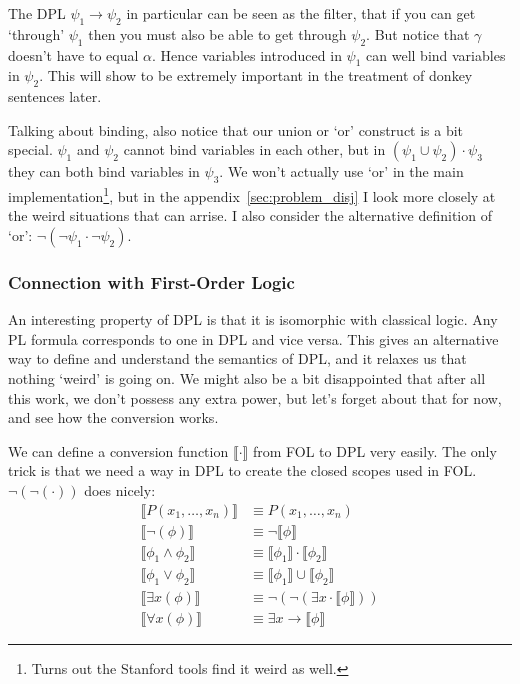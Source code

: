 \documentclass[12pt]{article}
\begin{document}
The DPL $\psi_1\rightarrow\psi_2$ in particular can be seen as the filter, that if you can get `through' $\psi_1$ then you must also be able to get through $\psi_2$. But notice that $\gamma$ doesn't have to equal $\alpha$. Hence variables introduced in $\psi_1$ can well bind variables in $\psi_2$. This will show to be extremely important in the treatment of donkey sentences later.

Talking about binding, also notice that our union or `or' construct is a bit special. $\psi_1$ and $\psi_2$ cannot bind variables in each other, but in $(\psi_1\cup\psi_2)\cdot\psi_3$ they can both bind variables in $\psi_3$. We won't actually use `or' in the main implementation\footnote{Turns out the Stanford tools find it weird as well.}, but in the appendix~\ref{sec:problem_disj} I look more closely at the weird situations that can arrise. I also consider the alternative definition of `or': $\neg(\neg\psi_1\cdot\neg\psi_2)$.

\subsubsection{Connection with First-Order Logic}

An interesting property of DPL is that it is isomorphic with classical logic. Any PL formula corresponds to one in DPL and vice versa. This gives an alternative way to define and understand the semantics of DPL, and it relaxes us that nothing `weird' is going on. We might also be a bit disappointed that after all this work, we don't possess any extra power, but let's forget about that for now, and see how the conversion works.

We can define a conversion function $\llbracket\cdot\rrbracket$ from FOL to DPL very easily. The only trick is that we need a way in DPL to create the closed scopes used in FOL. $\neg(\neg(\cdot))$ does nicely:
\begin{align}
\llbracket P(x_1,\dots,x_n)\rrbracket &\equiv P(x_1,\dots,x_n)\\
\llbracket \neg(\phi)\rrbracket &\equiv \neg\llbracket \phi\rrbracket\\
\llbracket \phi_1\wedge\phi_2\rrbracket &\equiv \llbracket \phi_1\rrbracket\cdot\llbracket \phi_2\rrbracket\\
\llbracket \phi_1\vee\phi_2\rrbracket &\equiv \llbracket \phi_1\rrbracket\cup\llbracket \phi_2\rrbracket\\
\llbracket \exists x(\phi)\rrbracket &\equiv \neg(\neg(\exists x \cdot \llbracket \phi\rrbracket))\\
\llbracket \forall x(\phi)\rrbracket &\equiv \exists x \rightarrow \llbracket \phi\rrbracket
\end{align}
\end{document}
